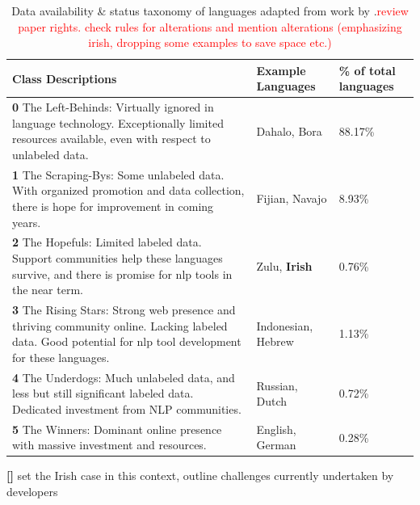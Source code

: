 \documentclass[thesis]{cluu}
\newcounter{paranum}
\newcommand{\numberedparagraph}{\par\refstepcounter{paranum}\textbf{[\theparanum] }}
\newcommand{\todo}[1]{\textcolor{red}{#1}}
\begin{document}
\begin{table}[h]
    \centering
    \begin{tabularx}{\textwidth}{|X|p{2cm}|p{1.75cm}|}
        \hline
        \textbf{Class Descriptions} & \textbf{Example Languages} & \textbf{\% of total languages}\\ \hline
        \textbf{0} The Left-Behinds: Virtually ignored in language technology. Exceptionally limited resources available, even with respect to unlabeled data. & Dahalo, Bora & 88.17\%\\ \hline
        \textbf{1} The Scraping-Bys: Some unlabeled data. With organized promotion and data collection, there is hope for improvement in coming years. & Fijian, Navajo & 8.93\%\\ \hline
        \textbf{2} The Hopefuls: Limited labeled data. Support communities help these languages survive, and there is promise for \gls{nlp} tools in the near term. & Zulu, \textbf{Irish} & 0.76\%\\ \hline
        \textbf{3} The Rising Stars: Strong web presence and thriving community online. Lacking labeled data. Good potential for \gls{nlp} tool development for these languages. & Indonesian, Hebrew & 1.13\%\\ \hline
        \textbf{4} The Underdogs: Much unlabeled data, and less but still significant labeled data. Dedicated investment from NLP communities. & Russian, Dutch & 0.72\%\\ \hline
        \textbf{5} The Winners: Dominant online presence with massive investment and resources. & English, German & 0.28\%\\ \hline
    \end{tabularx}
    \caption{Data availability \& status taxonomy of languages adapted from work by \textcite{joshiStateFateLinguistic2021}.\todo{review paper rights. check rules for alterations and mention alterations (emphasizing irish, dropping some examples to save space etc.)}}
    \label{tab:data_availability}
\end{table}
\numberedparagraph{set the Irish case in this context, outline challenges currently undertaken by developers}
\end{document}
